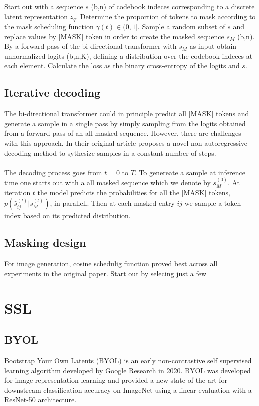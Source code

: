 \documentclass[../../thesis.tex]{subfiles}
\begin{document}
Start out with a sequence $s$ (b,n) of codebook indeces corresponding to a discrete latent representation $z_q$. Determine the proportion of tokens to mask according to the mask scheduling function $\gamma(t)\in (0,1]$. 
Sample a random subset of $s$ and replace values by [MASK] token in order to create the masked sequence $s_M$ (b,n). By a forward pass of the bi-directional transformer with $s_M$ as input obtain unnormalized logits (b,n,K), defining a distribution over the codebook indeces at each element. Calculate the loss as the binary cross-entropy of the logits and $s$. 

\subsection{Iterative decoding}

The bi-directional transformer could in principle predict all [MASK] tokens and generate a sample in a single pass by simply sampling from the logits obtained from a forward pass of an all masked sequence. However, there are challenges with this approach. In their original article  \cite{chang2022maskgit} proposes a novel non-autoregressive decoding method to sythesize samples in a constant number of steps.\\\\

The decoding process goes from $t = 0$ to $T$. To genereate a sample at inference time one starts out with a all masked sequence which we denote by $s_M^{(0)}$. At iteration $t$ the model predicts the probabilities for all the [MASK] tokens, $p(\hat{s}_{ij}^{(t)}|s_M^{(t)})$, in parallell. Then at each masked entry $ij$ we sample a token index based on its predicted distribution.  

\subsection{Masking design}

For image generation, cosine schedulig function proved best across all experiments in the original paper. Start out by selecing just a few 




\section{SSL}


\subsection{BYOL}
\cite{grill2020bootstrap}
Bootstrap Your Own Latents (BYOL) is an early non-contrastive self supervised learning algorithm developed by Google Research in 2020. BYOL was developed for image representation learning and provided a new state of the art for downstream classification accuracy on ImageNet using a linear evaluation with a ResNet-50 architecture. 
\end{document}
